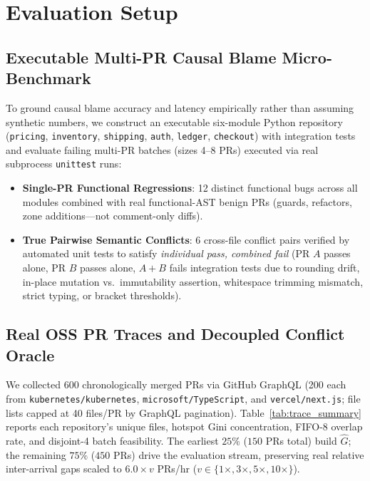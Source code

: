\section{Evaluation Setup}
\label{sec:eval_setup}

\subsection{Executable Multi-PR Causal Blame Micro-Benchmark}
To ground causal blame accuracy and latency empirically rather than assuming synthetic numbers, we construct an executable six-module Python repository (\texttt{pricing}, \texttt{inventory}, \texttt{shipping}, \texttt{auth}, \texttt{ledger}, \texttt{checkout}) with integration tests and evaluate \BenchTotalBatches{} failing multi-PR batches (sizes 4--8 PRs) executed via real subprocess \texttt{unittest} runs:
\begin{itemize}
    \item \textbf{\BenchSingleBatches{} Single-PR Functional Regressions}: 12 distinct functional bugs across all modules combined with real functional-AST benign PRs (guards, refactors, zone additions---not comment-only diffs).
    \item \textbf{\BenchSemBatches{} True Pairwise Semantic Conflicts}: 6 cross-file conflict pairs verified by automated unit tests to satisfy \emph{individual pass, combined fail} (PR $A$ passes alone, PR $B$ passes alone, $A+B$ fails integration tests due to rounding drift, in-place mutation vs.\ immutability assertion, whitespace trimming mismatch, strict typing, or bracket thresholds).
\end{itemize}

\subsection{Real OSS PR Traces and Decoupled Conflict Oracle}
We collected 600 chronologically merged PRs via GitHub GraphQL (200 each from \texttt{kubernetes/kubernetes}, \texttt{microsoft/TypeScript}, and \texttt{vercel/next.js}; file lists capped at 40 files/PR by GraphQL pagination). Table~\ref{tab:trace_summary} reports each repository's unique files, hotspot Gini concentration, FIFO-8 overlap rate, and disjoint-4 batch feasibility. The earliest $25\%$ ($150$ PRs total) build $\hat{G}$; the remaining $75\%$ ($450$ PRs) drive the evaluation stream, preserving real relative inter-arrival gaps scaled to $6.0\times v$ PRs/hr ($v \in \{1\times, 3\times, 5\times, 10\times\}$).

